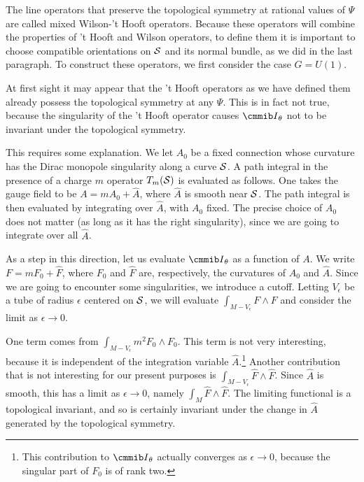 The line operators that preserve the topological symmetry at
rational values of $\Psi$ are called mixed Wilson-'t Hooft
operators.  Because these operators will combine the properties of
't Hooft and Wilson operators, to define them it is important to
choose compatible orientations on ${\cal S}$ and its normal
bundle, as we did in the last paragraph. To construct these
operators, we first consider the case $G=U(1)$.

At first sight it may appear that the 't Hooft operators as we
have defined them already possess the topological symmetry at any
$\Psi$.  This is in fact not true, because the singularity of the
't Hooft operator causes ${{\cmmib I}}_\theta$ not to be invariant
under the topological symmetry.

This requires some explanation.  We let $A_0$ be a fixed
connection whose curvature has the Dirac monopole singularity
along a curve ${{\cal S}}$.  A path integral in the presence of a
charge $m$ operator $T_m({{\cal S}})$ is evaluated as follows. One
takes the gauge field to be $A=mA_0+\hat A$, where $\hat A$ is
smooth near ${{\cal S}}$. The path integral is then evaluated by
integrating over $\hat A$, with $A_0$ fixed.  The precise choice
of $A_0$ does not matter (as long as it has the right
singularity), since we are going to integrate over all $\hat A$.

As a step in this direction, let us evaluate ${{\cmmib I}}_\theta$
as a function of $A$.  We write $F=mF_0+\hat F$, where $F_0$ and
$\hat F$ are, respectively, the curvatures of $A_0$ and $\hat A$.
Since we are going to encounter some singularities, we introduce a
cutoff. Letting $V_\epsilon$ be a tube of radius $\epsilon$
centered on ${{\cal S}}$, we will evaluate $\int_{M-V_\epsilon}
F\wedge F$ and consider the limit as $\epsilon\to 0$.

One term comes from $\int_{M-V_\epsilon}m^2 F_0\wedge F_0$.  This
term is not very interesting, because it is independent of the
integration variable $\hat A$.\footnote{This contribution to ${\cmmib
I}_\theta$ actually converges as $\epsilon\to 0$, because the
singular part of $F_0$ is of rank two.} Another contribution that
is not interesting for our present purposes is
$\int_{M-V_\epsilon}\hat F\wedge \hat F$.  Since $\hat A$ is
smooth, this has a limit as $\epsilon\to 0$, namely $\int_M \hat
F\wedge \hat F$. The limiting functional is a topological
invariant, and so is certainly invariant under the change in $\hat
A$ generated by the topological symmetry.

